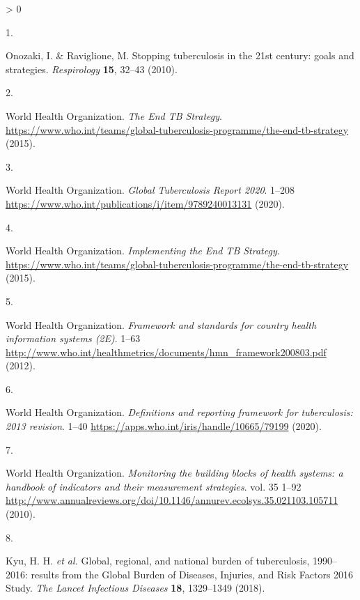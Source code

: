 \documentclass[
]{article}
\newlength{\cslhangindent}
\newlength{\csllabelwidth}
\newenvironment{CSLReferences}[2] %
 {%
  \setlength{\parindent}{0pt}
  \ifodd #1 \everypar{\setlength{\hangindent}{\cslhangindent}}\ignorespaces\fi
  \ifnum #2 > 0
  \setlength{\parskip}{#2\baselineskip}
  \fi
 }%
 {}
\newcommand{\CSLLeftMargin}[1]{\parbox[t]{\csllabelwidth}{#1}}
\newcommand{\CSLRightInline}[1]{\parbox[t]{\linewidth - \csllabelwidth}{#1}\break}
\begin{document}
\hypertarget{refs}{}
\begin{CSLReferences}{0}{0}
\leavevmode\hypertarget{ref-Onozaki2010}{}%
\CSLLeftMargin{1. }
\CSLRightInline{Onozaki, I. \& Raviglione, M. {Stopping tuberculosis in the 21st century: goals and strategies}. \emph{Respirology} \textbf{15}, 32--43 (2010).}

\leavevmode\hypertarget{ref-WorldHealthOrganization2015a}{}%
\CSLLeftMargin{2. }
\CSLRightInline{World Health Organization. \emph{{The End TB Strategy}}. \url{https://www.who.int/teams/global-tuberculosis-programme/the-end-tb-strategy} (2015).}

\leavevmode\hypertarget{ref-WorldHealthOrganization2020a}{}%
\CSLLeftMargin{3. }
\CSLRightInline{World Health Organization. \emph{{Global Tuberculosis Report 2020}}. 1--208 \url{https://www.who.int/publications/i/item/9789240013131} (2020).}

\leavevmode\hypertarget{ref-WorldHealthOrganization2015}{}%
\CSLLeftMargin{4. }
\CSLRightInline{World Health Organization. \emph{{Implementing the End TB Strategy}}. \url{https://www.who.int/teams/global-tuberculosis-programme/the-end-tb-strategy} (2015).}

\leavevmode\hypertarget{ref-WHOWorldHealthOrganization2008}{}%
\CSLLeftMargin{5. }
\CSLRightInline{World Health Organization. \emph{{Framework and standards for country health information systems (2E)}}. 1--63 \url{http://www.who.int/healthmetrics/documents/hmn_framework200803.pdf} (2012).}

\leavevmode\hypertarget{ref-WorldHealthOrganization2020}{}%
\CSLLeftMargin{6. }
\CSLRightInline{World Health Organization. \emph{{Definitions and reporting framework for tuberculosis: 2013 revision}}. 1--40 \url{https://apps.who.int/iris/handle/10665/79199} (2020).}

\leavevmode\hypertarget{ref-WorldHealthOrganization2010}{}%
\CSLLeftMargin{7. }
\CSLRightInline{World Health Organization. \emph{{Monitoring the building blocks of health systems: a handbook of indicators and their measurement strategies}}. vol. 35 1--92 \url{http://www.annualreviews.org/doi/10.1146/annurev.ecolsys.35.021103.105711} (2010).}

\leavevmode\hypertarget{ref-Kyu2018}{}%
\CSLLeftMargin{8. }
\CSLRightInline{Kyu, H. H. \emph{et al.} {Global, regional, and national burden of tuberculosis, 1990--2016: results from the Global Burden of Diseases, Injuries, and Risk Factors 2016 Study}. \emph{The Lancet Infectious Diseases} \textbf{18}, 1329--1349 (2018).}


\end{CSLReferences}
\end{document}
